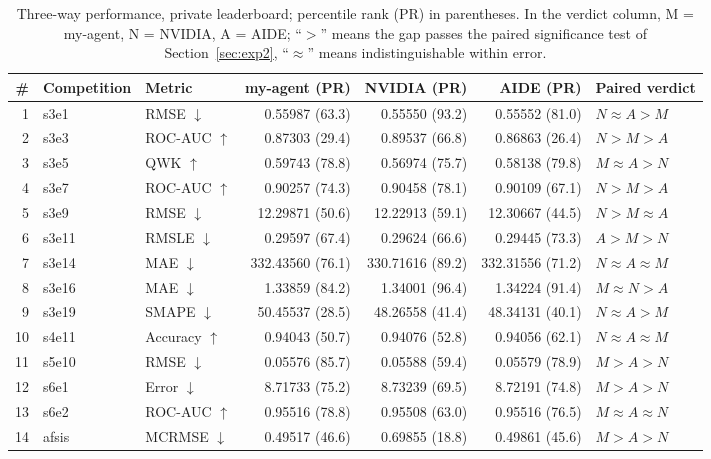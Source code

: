 \documentclass[11pt,a4paper]{article}
\newcommand{\dn}{\ensuremath{\downarrow}}
\newcommand{\up}{\ensuremath{\uparrow}}
\newcommand{\M}{M}   %
\newcommand{\N}{N}   %
\newcommand{\A}{A}   %
\begin{document}
\begin{table}[htbp]
\centering\footnotesize
\setlength{\tabcolsep}{3.5pt}
\caption{Three-way performance, private leaderboard; percentile rank (PR) in parentheses. In the verdict column, \M{} = my-agent, \N{} = NVIDIA, \A{} = AIDE; ``$>$'' means the gap passes the paired significance test of Section~\ref{sec:exp2}, ``$\approx$'' means indistinguishable within error.}
\label{tab:private}
\begin{tabular}{@{}rllrrrl@{}}
\toprule
\# & \textbf{Competition} & \textbf{Metric} & \textbf{my-agent (PR)} & \textbf{NVIDIA (PR)} & \textbf{AIDE (PR)} & \textbf{Paired verdict} \\
\midrule
1 & s3e1 & RMSE \dn & 0.55987 (63.3) & 0.55550 (93.2) & 0.55552 (81.0) & $\N \approx \A > \M$ \\
2 & s3e3 & ROC-AUC \up & 0.87303 (29.4) & 0.89537 (66.8) & 0.86863 (26.4) & $\N > \M > \A$ \\
3 & s3e5 & QWK \up & 0.59743 (78.8) & 0.56974 (75.7) & 0.58138 (79.8) & $\M \approx \A > \N$ \\
4 & s3e7 & ROC-AUC \up & 0.90257 (74.3) & 0.90458 (78.1) & 0.90109 (67.1) & $\N > \M > \A$ \\
5 & s3e9 & RMSE \dn & 12.29871 (50.6) & 12.22913 (59.1) & 12.30667 (44.5) & $\N > \M \approx \A$ \\
6 & s3e11 & RMSLE \dn & 0.29597 (67.4) & 0.29624 (66.6) & 0.29445 (73.3) & $\A > \M > \N$ \\
7 & s3e14 & MAE \dn & 332.43560 (76.1) & 330.71616 (89.2) & 332.31556 (71.2) & $\N \approx \A \approx \M$ \\
8 & s3e16 & MAE \dn & 1.33859 (84.2) & 1.34001 (96.4) & 1.34224 (91.4) & $\M \approx \N > \A$ \\
9 & s3e19 & SMAPE \dn & 50.45537 (28.5) & 48.26558 (41.4) & 48.34131 (40.1) & $\N \approx \A > \M$ \\
10 & s4e11 & Accuracy \up & 0.94043 (50.7) & 0.94076 (52.8) & 0.94056 (62.1) & $\N \approx \A \approx \M$ \\
11 & s5e10 & RMSE \dn & 0.05576 (85.7) & 0.05588 (59.4) & 0.05579 (78.9) & $\M > \A > \N$ \\
12 & s6e1 & Error \dn & 8.71733 (75.2) & 8.73239 (69.5) & 8.72191 (74.8) & $\M > \A > \N$ \\
13 & s6e2 & ROC-AUC \up & 0.95516 (78.8) & 0.95508 (63.0) & 0.95516 (76.5) & $\M \approx \A \approx \N$ \\
14 & afsis & MCRMSE \dn & 0.49517 (46.6) & 0.69855 (18.8) & 0.49861 (45.6) & $\M > \A > \N$ \\

\end{tabular}
\end{table}
\end{document}
